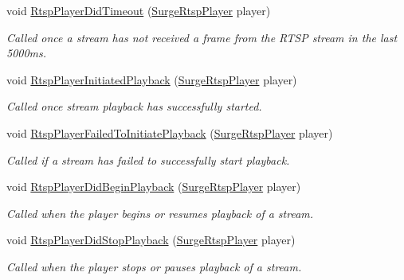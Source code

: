 \begin{DoxyCompactItemize}
\item 
void \hyperlink{interface_surge_xamarini_o_s_bindings_1_1_surge_rtsp_player_delegate_a090498b65f3da84477fc9486e24235a4}{Rtsp\+Player\+Did\+Timeout} (\hyperlink{interface_surge_xamarini_o_s_bindings_1_1_surge_rtsp_player}{Surge\+Rtsp\+Player} player)
\begin{DoxyCompactList}\small\item\em Called once a stream has not received a frame from the R\+T\+SP stream in the last 5000ms. \end{DoxyCompactList}\item 
void \hyperlink{interface_surge_xamarini_o_s_bindings_1_1_surge_rtsp_player_delegate_a086947a6da6d523853a8cfacd4be654a}{Rtsp\+Player\+Initiated\+Playback} (\hyperlink{interface_surge_xamarini_o_s_bindings_1_1_surge_rtsp_player}{Surge\+Rtsp\+Player} player)
\begin{DoxyCompactList}\small\item\em Called once stream playback has successfully started. \end{DoxyCompactList}\item 
void \hyperlink{interface_surge_xamarini_o_s_bindings_1_1_surge_rtsp_player_delegate_a50991332700fd45a8a2771e35bd6016c}{Rtsp\+Player\+Failed\+To\+Initiate\+Playback} (\hyperlink{interface_surge_xamarini_o_s_bindings_1_1_surge_rtsp_player}{Surge\+Rtsp\+Player} player)
\begin{DoxyCompactList}\small\item\em Called if a stream has failed to successfully start playback. \end{DoxyCompactList}\item 
void \hyperlink{interface_surge_xamarini_o_s_bindings_1_1_surge_rtsp_player_delegate_ad4dabfca0a807a5d2e5edb1c0325379d}{Rtsp\+Player\+Did\+Begin\+Playback} (\hyperlink{interface_surge_xamarini_o_s_bindings_1_1_surge_rtsp_player}{Surge\+Rtsp\+Player} player)
\begin{DoxyCompactList}\small\item\em Called when the player begins or resumes playback of a stream. \end{DoxyCompactList}\item 
void \hyperlink{interface_surge_xamarini_o_s_bindings_1_1_surge_rtsp_player_delegate_acbda4e7146444810d2800ad8e6a90d88}{Rtsp\+Player\+Did\+Stop\+Playback} (\hyperlink{interface_surge_xamarini_o_s_bindings_1_1_surge_rtsp_player}{Surge\+Rtsp\+Player} player)
\begin{DoxyCompactList}\small\item\em Called when the player stops or pauses playback of a stream. \end{DoxyCompactList}\item 

\end{DoxyCompactItemize}
